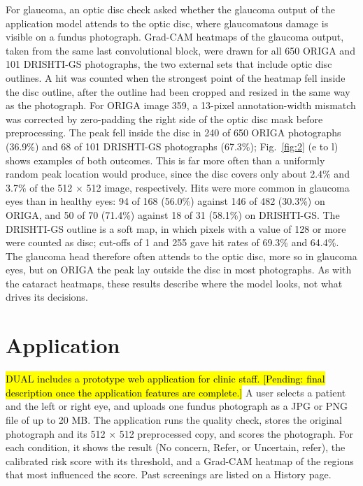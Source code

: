 \documentclass[conference,a4paper]{IEEEtran}
\newcommand{\pendingedit}[1]{\hl{#1}}
\begin{document}
For glaucoma, an optic disc check asked whether the glaucoma output of the application model attends
to the optic disc, where glaucomatous damage is visible on a fundus photograph. Grad-CAM heatmaps of
the glaucoma output, taken from the same last convolutional block, were drawn for all 650 ORIGA and
101 DRISHTI-GS photographs, the two external sets that include optic disc outlines. A hit was
counted when the strongest point of the heatmap fell inside the disc outline, after the outline had
been cropped and resized in the same way as the photograph. For ORIGA image 359, a 13-pixel
annotation-width mismatch was corrected by zero-padding the right side of the optic disc mask
before preprocessing. The peak fell inside the disc in 240 of
650 ORIGA photographs (36.9\%) and 68 of 101 DRISHTI-GS photographs (67.3\%); Fig.~\ref{fig:2} (e to
l) shows examples of both outcomes. This is far more often than a uniformly random peak location
would produce, since the disc covers only about 2.4\% and 3.7\% of the 512 \(\times\) 512 image,
respectively. Hits were more common in glaucoma eyes than in healthy eyes: 94 of 168 (56.0\%)
against 146 of 482 (30.3\%) on ORIGA, and 50 of 70 (71.4\%) against 18 of 31 (58.1\%) on DRISHTI-GS.
The DRISHTI-GS outline is a soft map, in which pixels with a value of 128 or more were counted as
disc; cut-offs of 1 and 255 gave hit rates of 69.3\% and 64.4\%. The glaucoma head therefore often
attends to the optic disc, more so in glaucoma eyes, but on ORIGA the peak lay outside the disc in
most photographs. As with the cataract heatmaps, these results describe where the model looks, not
what drives its decisions.

\section{Application}

\pendingedit{DUAL includes a prototype web application for clinic staff. [Pending: final description once the
application features are complete.]} A user selects a patient and the left or right eye, and uploads
one fundus photograph as a JPG or PNG file of up to 20 MB. The application runs the quality check,
stores the original photograph and its 512 \(\times\) 512 preprocessed copy, and scores the
photograph. For each condition, it shows the result (No concern, Refer, or Uncertain, refer), the
calibrated risk score with its threshold, and a Grad-CAM heatmap \cite{ref10} of the regions that
most influenced the score. Past screenings are listed on a History page.
\end{document}
